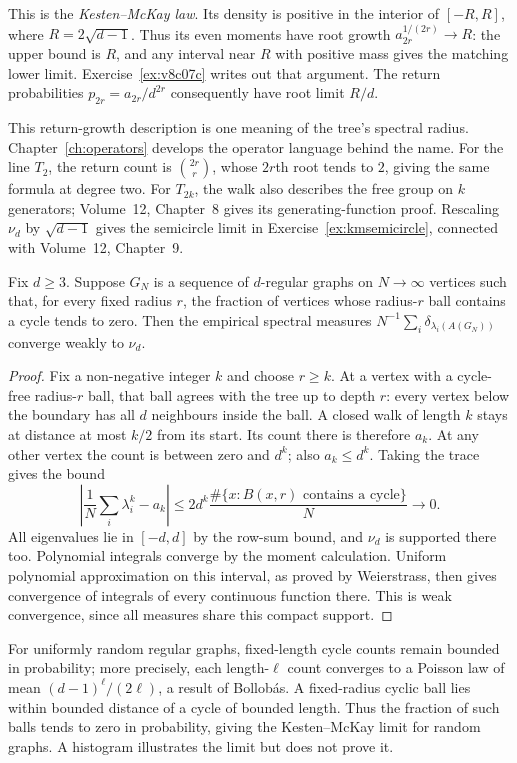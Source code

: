 This is the \emph{Kesten--McKay law}. Its density is positive in the interior of $[-R,R]$, where $R=2\sqrt{d-1}$. Thus its even moments have root growth $a_{2r}^{1/(2r)}\to R$: the upper bound is $R$, and any interval near $R$ with positive mass gives the matching lower limit. Exercise~\ref{ex:v8c07c} writes out that argument. The return probabilities $p_{2r}=a_{2r}/d^{2r}$ consequently have root limit $R/d$.

This return-growth description is one meaning of the tree's spectral radius. Chapter~\ref{ch:operators} develops the operator language behind the name. For the line $T_2$, the return count is $\binom{2r}{r}$, whose $2r$th root tends to $2$, giving the same formula at degree two. For $T_{2k}$, the walk also describes the free group on $k$ generators; Volume~12, Chapter~8 gives its generating-function proof. Rescaling $\nu_d$ by $\sqrt{d-1}$ gives the semicircle limit in Exercise~\ref{ex:kmsemicircle}, connected with Volume~12, Chapter~9.

\begin{theorem}[McKay, 1981]\label{thm:mckay}
Fix $d\ge3$. Suppose $G_N$ is a sequence of $d$-regular graphs on $N\to\infty$ vertices such that, for every fixed radius $r$, the fraction of vertices whose radius-$r$ ball contains a cycle tends to zero. Then the empirical spectral measures
$N^{-1}\sum_i\delta_{\lambda_i(A(G_N))}$ converge weakly to $\nu_d$.
\end{theorem}
\begin{proof}
Fix a non-negative integer $k$ and choose $r\ge k$. At a vertex with a cycle-free radius-$r$ ball, that ball agrees with the tree up to depth $r$: every vertex below the boundary has all $d$ neighbours inside the ball. A closed walk of length $k$ stays at distance at most $k/2$ from its start. Its count there is therefore $a_k$.
At any other vertex the count is between zero and $d^k$; also $a_k\le d^k$. Taking the trace gives the bound
\[
\left|\frac1N\sum_i\lambda_i^k-a_k\right|
\le2d^k\frac{\#\{x:B(x,r)\text{ contains a cycle}\}}N\longrightarrow0.
\]
All eigenvalues lie in $[-d,d]$ by the row-sum bound, and $\nu_d$ is supported there too. Polynomial integrals converge by the moment calculation. Uniform polynomial approximation on this interval, as proved by Weierstrass, then gives convergence of integrals of every continuous function there. This is weak convergence, since all measures share this compact support.
\end{proof}

For uniformly random regular graphs, fixed-length cycle counts remain bounded in probability; more precisely, each length-$\ell$ count converges to a Poisson law of mean $(d-1)^\ell/(2\ell)$, a result of Bollob\'as. A fixed-radius cyclic ball lies within bounded distance of a cycle of bounded length. Thus the fraction of such balls tends to zero in probability, giving the Kesten--McKay limit for random graphs. A histogram illustrates the limit but does not prove it.

